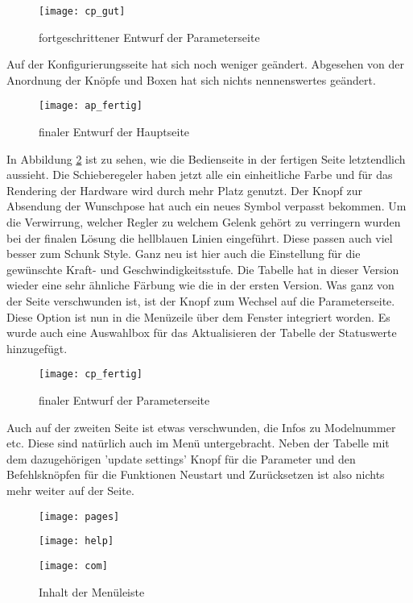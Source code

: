\documentclass[11pt]{scrartcl}
\begin{document}
\begin{onehalfspace}
\begin{figure}[H]
\texttt{[image: cp\_gut]}
\caption{fortgeschrittener   Entwurf der Parameterseite}
\label{fig:cp_gut}
\end{figure}
\vspace{1cm}

Auf der Konfigurierungsseite hat sich noch weniger geändert. Abgesehen von der Anordnung der Knöpfe und Boxen hat sich nichts nennenswertes geändert.

\begin{figure}[H]
\texttt{[image: ap\_fertig]}
\caption{finaler Entwurf der Hauptseite}
\label{fig:ap_fertig}
\end{figure}
\vspace{1cm}

In Abbildung \ref{fig:ap_fertig} ist zu sehen, wie die Bedienseite in der fertigen Seite letztendlich aussieht. Die Schieberegeler haben jetzt alle ein einheitliche Farbe und für das Rendering der Hardware wird durch mehr Platz genutzt. Der Knopf zur Absendung der Wunschpose hat auch ein neues Symbol verpasst bekommen. Um die Verwirrung, welcher Regler zu welchem Gelenk gehört zu verringern wurden bei der finalen Lösung die hellblauen Linien eingeführt. Diese passen auch viel besser zum Schunk Style. Ganz neu ist hier auch die Einstellung für die gewünschte Kraft- und Geschwindigkeitsstufe. Die Tabelle hat in dieser Version wieder eine sehr ähnliche Färbung wie die in der ersten Version. Was ganz von der Seite verschwunden ist, ist der Knopf zum Wechsel auf die Parameterseite. Diese Option ist nun in die Menüzeile über dem Fenster integriert worden. Es wurde auch eine Auswahlbox für das Aktualisieren der Tabelle der Statuswerte hinzugefügt.

\begin{figure}[H]
\texttt{[image: cp\_fertig]}
\caption{finaler Entwurf der Parameterseite}
\label{fig:cp_fertig}
\end{figure}
\vspace{1cm}

Auch auf der zweiten Seite ist etwas verschwunden, die Infos zu Modelnummer etc. Diese sind natürlich auch im Menü untergebracht. Neben der Tabelle mit dem dazugehörigen 'update settings' Knopf für die Parameter und den Befehlsknöpfen für die Funktionen Neustart und Zurücksetzen ist also nichts mehr weiter auf der Seite.


\begin{figure}[H]
\begin{minipage}[t]{0.3\textwidth}
\texttt{[image: pages]}
\end{minipage}
\hfill
\begin{minipage}[t]{0.3\textwidth}
\texttt{[image: help]}
\end{minipage}
\hfill
\begin{minipage}[t]{0.3\textwidth}
\texttt{[image: com]}
\end{minipage}
\caption{Inhalt der Menüleiste}
\label{fig:menu}
\end{figure}
\vspace{1cm}


\end{onehalfspace}
\end{document}
